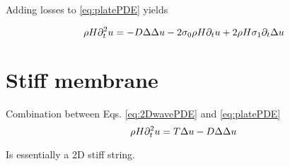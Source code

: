 Adding losses to \eqref{eq:platePDE} yields 

\begin{equation}\label{eq:platePDE}
    \rho H \partial_t^2 u = -D\Delta\Delta u - 2\sigma_{0} \rho H \partial_t u + 2 \rho H \sigma_{1} \partial_t \Delta u
\end{equation}




\section{Stiff membrane}
Combination between Eqs. \eqref{eq:2DwavePDE} and \eqref{eq:platePDE}
\begin{equation}\label{eq:2DwavePDE}
    \rho H \partial_t^2 u = T\Delta u - D
    \Delta\Delta u
\end{equation}
\citeP[F]

Is essentially a 2D stiff string. 